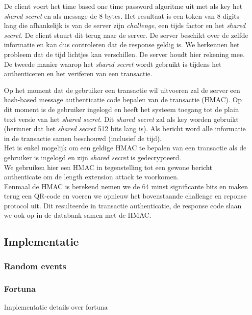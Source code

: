 \documentclass[11pt]{article}
\begin{document}
De client voert het time based one time password algoritme uit met als key het \emph{shared secret} en als message de 8 bytes. Het resultaat is een token van 8 digits lang die afhankelijk is van de server zijn \emph{challenge}, een tijds factor en het \emph{shared secret}. De client stuurt dit terug naar de server. De server beschikt over de zelfde informatie en kan dus controleren dat de response geldig is. We herkennen het probleem dat de tijd lichtjes kan verschillen. De server houdt hier rekening mee.\\

De tweede manier waarop het \emph{shared secret} wordt gebruikt is tijdens het authenticeren en het veriferen van een transactie.

Op het moment dat de gebruiker een transactie wil uitvoeren zal de server een hash-based message authenticatie code bepalen van de transactie (HMAC). Op dit moment is de gebruiker ingelogd en heeft het systeem toegang tot de plain text versie van het \emph{shared secret}. Dit \emph{shared secret} zal als key worden gebruikt (herinner dat het \emph{shared secret} 512 bits lang is). Als bericht word alle informatie in de transactie samen beschouwd (inclusief de tijd). \\

Het is enkel mogelijk om een geldige HMAC te bepalen van een transactie als de gebruiker is ingelogd en zijn \emph{shared secret} is gedecrypteerd.\\

We gebruiken hier een HMAC in tegenstelling tot een gewone bericht authenticate om de length extension attack te voorkomen.\\

Eenmaal de HMAC is berekend nemen we de 64 minst significante bits en maken terug een QR-code en voeren we opnieuw het bovenstaande challenge en reponse protocol uit. Dit resulteerde in transactie authenticatie, de response code slaan we ook op in de databank samen met de HMAC.
\subsection{Implementatie}
\subsubsection{Random events}
\subsubsection{Fortuna}
\label{sec:fortuna}
Implementatie details over fortuna
\end{document}
